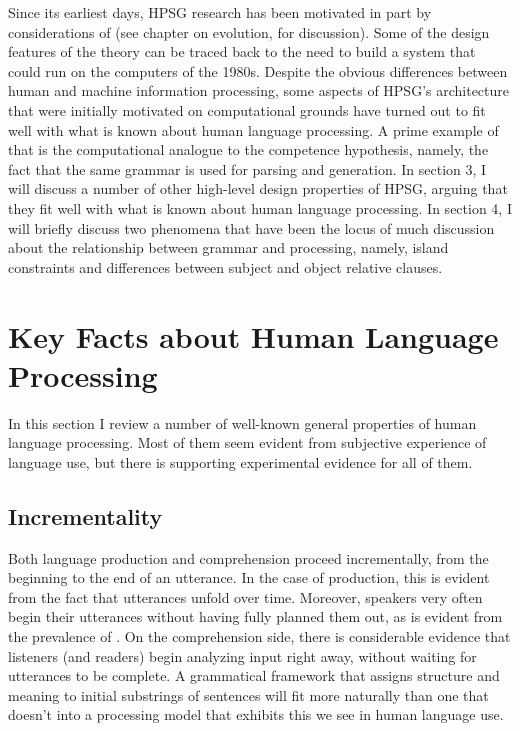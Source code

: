 \documentclass[a4paper]{article}
\begin{document}
Since its earliest days, HPSG research has been motivated in part by considerations of  (see  chapter on evolution, for discussion).  Some of the design features of the theory can be traced back to the need to build a system that could run on the computers of the 1980s.  Despite the obvious differences between human and machine information processing, some aspects of HPSG's architecture that were initially motivated on computational grounds have turned out to fit well with what is known about human language processing.  A prime example of that is the computational analogue to the competence hypothesis, namely, the fact that the same grammar is used for parsing and generation. In section 3, I will discuss a number of other high-level design properties of HPSG, arguing that they fit well with what is known about human language processing.  In section 4, I will briefly discuss two phenomena that have been the locus of much discussion about the relationship between grammar and processing, namely, island constraints and differences between subject and object relative clauses.

\section{Key Facts about Human Language Processing}

In this section I review a number of well-known general properties of human language processing.  Most of them seem evident from subjective experience of language use, but there is supporting experimental evidence for all of them.  

\subsection{Incrementality}

Both language production and comprehension proceed incrementally, from the beginning to the end of an utterance.  In the case of production, this is evident from the fact that utterances unfold over time.  Moreover, speakers very often begin their utterances without having fully planned them out, as is evident from the prevalence of .  On the comprehension side, there is considerable evidence that listeners (and readers) begin analyzing input right away, without waiting for utterances to be complete.  A grammatical framework that assigns structure and meaning to initial substrings of sentences will fit more naturally than one that doesn't into a processing model that exhibits this  we see in human language use.  
\end{document}
